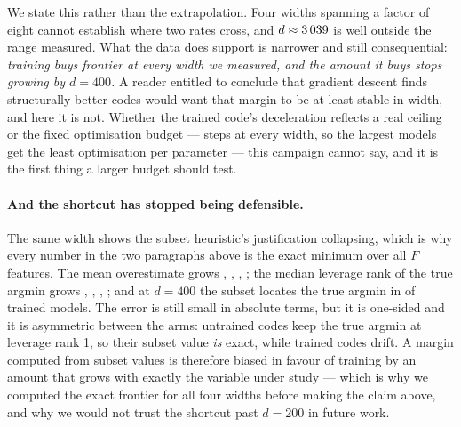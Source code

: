 \documentclass[preprint,12pt]{elsarticle}
\theoremstyle{definition}
\begin{document}
We state this rather than the extrapolation. Four widths spanning a factor of eight cannot establish
where two rates cross, and $d\approx3\,039$ is well outside the range measured. What the data
does support is narrower and still consequential: \emph{training buys frontier at every width we
measured, and the amount it buys stops growing by $d=400$.} A reader entitled to conclude that
gradient descent finds structurally better codes would want that margin to be at least stable in
width, and here it is not. Whether the trained code's deceleration reflects a real ceiling or the
fixed optimisation budget --- \EsevenSteps{} steps at every width, so the largest models get the
least optimisation per parameter --- this campaign cannot say, and it is the first thing a larger
budget should test.

\paragraph{And the shortcut has stopped being defensible.} The same width shows the subset
heuristic's justification collapsing, which is why every number in the two paragraphs above is the
exact minimum over all $F$ features. The mean overestimate grows \SubsetFiftyOver, \SubsetHundredOver,
\SubsetTwoHundredOver, \SubsetFourHundredOver; the median leverage rank of the true argmin grows
\SubsetFiftyRank, \SubsetHundredRank, \SubsetTwoHundredRank, \SubsetFourHundredRank; and at $d=400$
the subset locates the true argmin in \SubsetFourHundredFound{} of \ScSeeds{} trained models. The
error is still small in absolute terms, but it is one-sided and it is asymmetric between the arms:
untrained codes keep the true argmin at leverage rank 1, so their subset value \emph{is} exact, while
trained codes drift. A margin computed from subset values is therefore biased in favour of training
by an amount that grows with exactly the variable under study --- which is why we computed the exact
frontier for all four widths before making the claim above, and why we would not trust the shortcut
past $d=200$ in future work.
\end{document}
